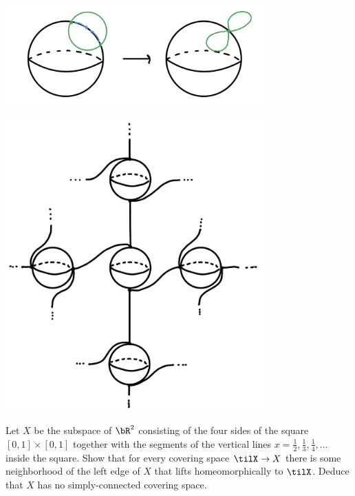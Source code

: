 \begin{homework}[e]
\begin{prf}
    \begin{center}
      \includegraphics[width=10cm]{figures/hwk5-fig6.jpg}
      \label{fig:prob4-3}
    \end{center}
    \begin{center}
      \includegraphics[width=10cm]{figures/hwk5-fig7.jpg}
      \label{fig:prob4-4}
    \end{center}
  \end{prf}
   Let $X$ be the subspace of $\bR^2$ consisting of the four sides of the square $[0,1]\times [0,1]$ together with the segments of the vertical lines $x = \frac{1}{2},\frac{1}{3},\frac{1}{4},...$ inside the square. Show that for every covering space $\tilX\to X$ there is some neighborhood of the left edge of $X$ that lifts homeomorphically to $\tilX$. Deduce that $X$ has no simply-connected covering space. 
  \begin{prf}

\end{prf}
\end{homework}
